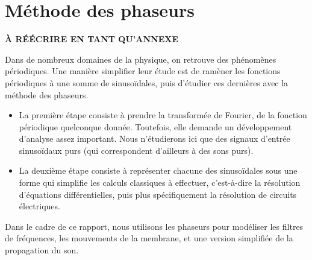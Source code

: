 \chapter{Méthode des phaseurs}

\textbf{À RÉÉCRIRE EN TANT QU'ANNEXE}

Dans de nombreux domaines de la physique,
on retrouve des phénomènes périodiques.
Une manière simplifier leur étude
est de ramèner les fonctions périodiques à une somme de sinusoïdales,
puis d'étudier ces dernières avec la méthode des phaseurs.
\begin{itemize}
    \item La première étape consiste à prendre la transformée de Fourier,
        de la fonction périodique quelconque donnée.
        Toutefois, elle demande un développement d'analyse assez important.
        Nous n'étudierons ici que des signaux d'entrée sinusoïdaux purs
        (qui correspondent d'ailleurs à des sons purs).
    \item La deuxième étape consiste à représenter chacune des sinusoïdales
        sous une forme qui simplifie les calculs classiques à effectuer,
        c'est-à-dire la résolution d'équations différentielles,
        puis plus spécifiquement la résolution de circuits électriques.
\end{itemize}

Dans le cadre de ce rapport,
nous utilisons les phaseurs pour modéliser les filtres de fréquences,
les mouvements de la membrane,
et une version simplifiée de la propagation du son.




